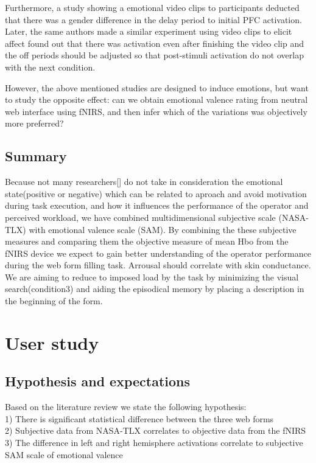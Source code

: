 \documentclass[a4paper]{report}
\begin{document}
			Furthermore, a study showing a emotional video clips\cite{leon2006differential} to participants deducted that there was a gender difference in the delay period to initial PFC activation. Later, the same authors made a similar experiment \cite{leon2007lasting} using video clips to elicit affect found out that there was activation even after finishing the video clip and the off periods should be adjusted so that post-stimuli activation do not overlap with the next condition.

			However, the above mentioned studies are designed to induce emotions, but want to study the opposite effect: can we obtain emotional valence rating from neutral web interface using fNIRS, and then infer which of the variations was objectively more preferred?

	\section{Summary}
		Because not many researchers[] do not take in consideration the emotional state(positive or negative) which can be related to aproach and avoid motivation during task execution, and how it influences the performance of the operator and perceived workload, we have combined multidimensional subjective scale (NASA-TLX) with emotional valence scale (SAM). By combining the these subjective measures and comparing them the objective measure of mean Hbo from the fNIRS device we expect to gain better understanding of the operator performance during the web form filling task.
		Arrousal should correlate with skin conductance.
		We are aiming to reduce to imposed load by the task by minimizing the visual search(condition3) and aiding the episodical memory by placing a description in the beginning of the form.
\chapter{User study}
	\section{Hypothesis and expectations}
	Based on the literature review we state the following hypothesis:\\
	1) There is significant statistical difference between the three web forms\\
	2) Subjective data from NASA-TLX correlates to objective data from the fNIRS\\
	3) The difference in left and right hemisphere activations correlate to subjective SAM scale of emotional valence\\	
\end{document}
